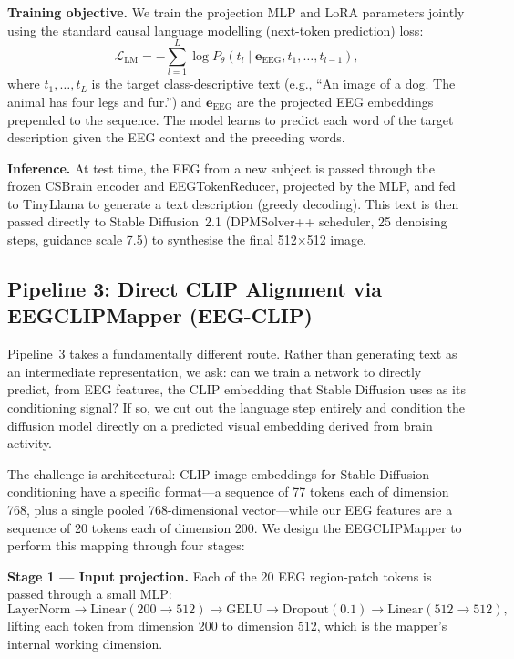 \documentclass{article}
\begin{document}
\textbf{Training objective.} We train the projection MLP and LoRA parameters jointly using the standard causal language modelling (next-token prediction) loss:
\begin{equation}
  \mathcal{L}_\mathrm{LM} = -\sum_{l=1}^{L} \log P_\theta(t_l \mid \mathbf{e}_\mathrm{EEG}, t_1, \ldots, t_{l-1}),
\end{equation}
where $t_1, \ldots, t_L$ is the target class-descriptive text (e.g., ``An image of a dog. The animal has four legs and fur.'') and $\mathbf{e}_\mathrm{EEG}$ are the projected EEG embeddings prepended to the sequence. The model learns to predict each word of the target description given the EEG context and the preceding words.

\textbf{Inference.} At test time, the EEG from a new subject is passed through the frozen CSBrain encoder and EEGTokenReducer, projected by the MLP, and fed to TinyLlama to generate a text description (greedy decoding). This text is then passed directly to Stable Diffusion~2.1 (DPMSolver++ scheduler, 25 denoising steps, guidance scale 7.5) to synthesise the final 512$\times$512 image.

\subsection{Pipeline 3: Direct CLIP Alignment via EEGCLIPMapper (EEG-CLIP)}

Pipeline~3 takes a fundamentally different route. Rather than generating text as an intermediate representation, we ask: can we train a network to directly predict, from EEG features, the CLIP embedding that Stable Diffusion uses as its conditioning signal? If so, we cut out the language step entirely and condition the diffusion model directly on a predicted visual embedding derived from brain activity.

The challenge is architectural: CLIP image embeddings for Stable Diffusion conditioning have a specific format---a sequence of 77 tokens each of dimension 768, plus a single pooled 768-dimensional vector---while our EEG features are a sequence of 20 tokens each of dimension 200. We design the EEGCLIPMapper to perform this mapping through four stages:

\textbf{Stage 1 --- Input projection.} Each of the 20 EEG region-patch tokens is passed through a small MLP:
\[
\text{LayerNorm} \to \text{Linear}(200 \to 512) \to \text{GELU} \to \text{Dropout}(0.1) \to \text{Linear}(512 \to 512),
\]
lifting each token from dimension 200 to dimension 512, which is the mapper's internal working dimension.
\end{document}
